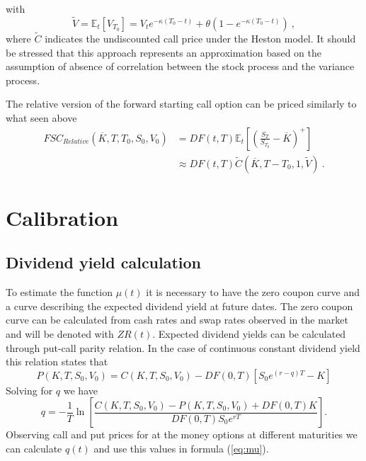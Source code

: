 with
\begin{equation}
\label{vol-cir-exp}
\widetilde{V} = \mathbb{E}_t[ V_{T_0} ] = V_t  e^{-\kappa  (T_0 -t) } + \theta \left(1 - e^{-\kappa   (T_0 -t) }\right) \ ,
\end{equation}
where  $\widetilde{C}$ indicates the undiscounted call price under the Heston model. 
It should be stressed that this approach represents an approximation based on the assumption of absence of correlation between the stock process and the variance process. 

The relative version of the forward starting call option can be priced similarly to what seen above
$$
\begin{aligned}
FSC_{Relative}(\overline{K}, T, T_0, S_0, V_0)  &= DF(t,T) \mathbb{E}_t   \left[\left(\frac{S_T}{S_{T_0}} - \overline{K} \right)^+\right] 
\\
&\approx
DF(t,T)   \widetilde{C}(\overline{K}, T-T_0, 1, \widetilde{V}) \ . 
\end{aligned}
$$






\section{Calibration}

\subsection{Dividend yield calculation}

To estimate the function $\mu(t)$ it is necessary to have the zero coupon curve and a curve describing the expected dividend yield at future dates. The zero coupon curve can be calculated from cash rates and swap rates observed in the market and will be denoted with $ZR(t)$. Expected dividend yields can be calculated through put-call parity relation. In the case of continuous constant dividend yield this relation states that
\begin{equation}
P(K, T, S_0, V_0) = C(K, T, S_0, V_0)  - DF(0,T) \left[ S_0 e^{(r-q)T} - K \right]
\end{equation}
Solving for $q$ we have
\begin{equation}
q = -\frac{1}{T}\ln\left[\frac{C(K, T, S_0, V_0)-P(K, T, S_0, V_0) +DF(0,T) K}{DF(0,T)S_0 e^{rT}}\right].
\end{equation}
Observing call and put prices for at the money options at different maturities we can calculate $q(t)$ and use this values in formula (\ref{eq:mu}).


